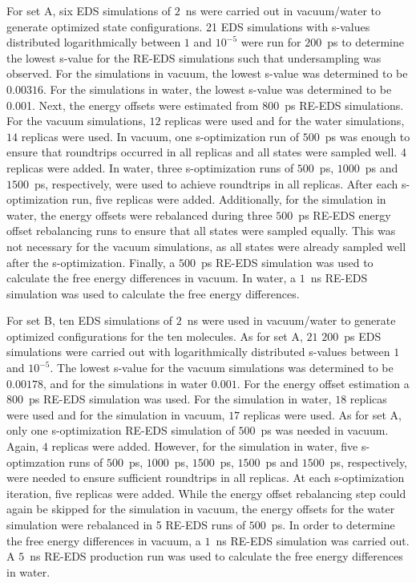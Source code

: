 For set A, six EDS simulations of $2$~ns were carried out in vacuum/water to generate optimized state configurations. 21 EDS simulations with s-values distributed logarithmically between $1$ and $10^{-5}$ were run for $200$~ps to determine the lowest s-value for the RE-EDS simulations such that undersampling was observed. For the simulations in vacuum, the lowest s-value was determined to be $0.00316$. For the simulations in water, the lowest s-value was determined to be 0.001. Next, the energy offsets were estimated from $800$~ps RE-EDS simulations. For the vacuum simulations, $12$ replicas were used and for the water simulations, $14$ replicas were used. In vacuum, one s-optimization run of $500$~ps was enough to ensure that roundtrips occurred in all replicas and all states were sampled well. 4 replicas were added. In water, three s-optimization runs of $500$~ps, $1000$~ps and $1500$~ps, respectively, were used to achieve roundtrips in all replicas. After each s-optimization run, five replicas were added. Additionally, for the simulation in water, the energy offsets were rebalanced during three $500$~ps RE-EDS energy offset rebalancing runs to ensure that all states were sampled equally. This was not necessary for the vacuum simulations, as all states were already sampled well after the s-optimization. Finally, a $500$~ps RE-EDS simulation was used to calculate the free energy differences in vacuum. In water, a $1$~ns RE-EDS simulation was used to calculate the free energy differences.

For set B, ten EDS simulations of $2$~ns were used in vacuum/water to generate optimized configurations for the ten molecules. As for set A, $21$ $200$~ps EDS simulations were carried out with logarithmically distributed s-values between $1$ and $10^{-5}$. The lowest s-value for the vacuum simulations was determined to be $0.00178$, and for the simulations in water $0.001$. For the energy offset estimation a $800$~ps RE-EDS simulation was used. For the simulation in water, $18$ replicas were used and for the simulation in vacuum, $17$ replicas were used. As for set A, only one s-optimization RE-EDS simulation of $500$~ps was needed in vacuum. Again, $4$ replicas were added. However, for the simulation in water, five s-optimzation runs of $500$~ps, $1000$~ps, $1500$~ps, $1500$~ps and $1500$~ps, respectively, were needed to ensure sufficient roundtrips in all replicas. At each s-optimization iteration, five replicas were added. While the energy offset rebalancing step could again be skipped for the simulation in vacuum, the energy offsets for the water simulation were rebalanced in 5 RE-EDS runs of $500$~ps. In order to determine the free energy differences in vacuum, a $1$~ns RE-EDS simulation was carried out. A $5$~ns RE-EDS production run was used to calculate the free energy differences in water.

